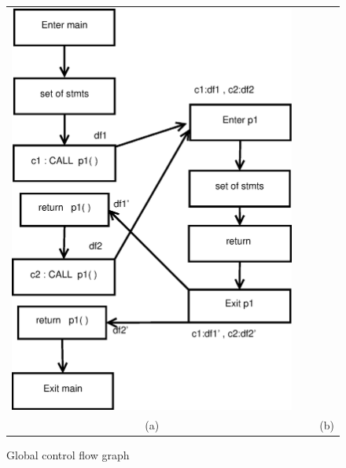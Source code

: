 \begin{figure}[h]
\begin{tabular}{c  c}
\includegraphics[scale=.4]{diagrams/Diagram12.eps} \\

\footnotesize (a)    & \   \   \  \footnotesize (b)

\end{tabular}

\caption{Global control flow graph}
\label{fig:Some}
\end{figure}
% 


